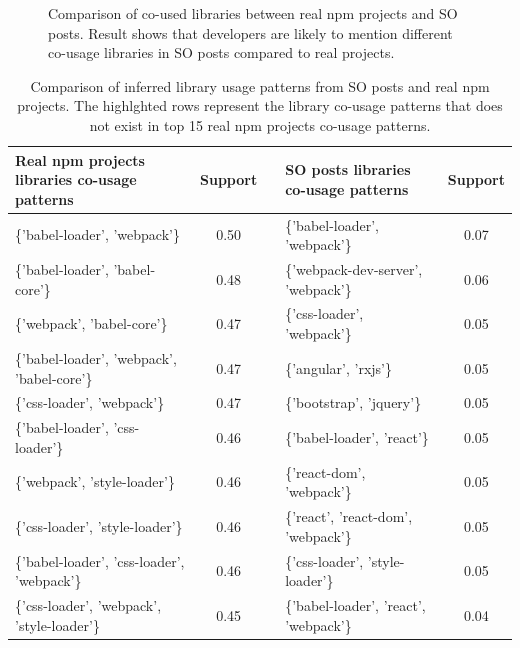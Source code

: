 \documentclass[paper]{ieice}
\begin{document}
\begin{figure}[t]
{{
        
    }}
    
 
    \caption{Comparison of co-used libraries between real npm projects and SO posts. Result shows that developers are likely to mention different co-usage libraries in SO posts compared to real projects.}
   
    \label{fig:PS1}
    \end{figure}


\begin{table}[t]
\centering
	\caption{Comparison of inferred library usage patterns from SO posts and real npm projects. The highlghted rows represent the library co-usage patterns that does not exist in top 15 real npm projects co-usage patterns.}
	\label{tab:ps2}
\begin{tabular}{@{}lc|llc@{}}
\toprule
Real npm projects libraries co-usage patterns & Support &  & SO posts libraries co-usage patterns & Support \\ \midrule
\{'babel-loader', 'webpack'\} & 0.50 &  & \{'babel-loader', 'webpack'\} & 0.07 \\
\{'babel-loader', 'babel-core'\} & 0.48 &  & \cellcolor[HTML]{999999}\{'webpack-dev-server', 'webpack'\} & 0.06 \\
\{'webpack', 'babel-core'\} & 0.47 &  & \{'css-loader', 'webpack'\} & 0.05 \\
\{'babel-loader', 'webpack', 'babel-core'\} & 0.47 &  & \cellcolor[HTML]{999999}\{'angular', 'rxjs'\} & 0.05 \\
\{'css-loader', 'webpack'\} & 0.47 &  & \cellcolor[HTML]{999999}\{'bootstrap', 'jquery'\} & 0.05 \\
\{'babel-loader', 'css-loader'\} & 0.46 &  & \cellcolor[HTML]{999999}\{'babel-loader', 'react'\} & 0.05 \\
\{'webpack', 'style-loader'\} & 0.46 &  & \cellcolor[HTML]{999999}\{'react-dom', 'webpack'\} & 0.05 \\
\{'css-loader', 'style-loader'\} & 0.46 &  & \cellcolor[HTML]{999999}\{'react', 'react-dom', 'webpack'\} & 0.05 \\
\{'babel-loader', 'css-loader', 'webpack'\} & 0.46 &  & \{'css-loader', 'style-loader'\} & 0.05 \\
\{'css-loader', 'webpack', 'style-loader'\} & 0.45 &  & \cellcolor[HTML]{999999}\{'babel-loader', 'react', 'webpack'\} & 0.04 \\

\end{tabular}
\end{table}
\end{document}
